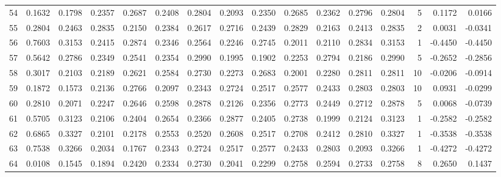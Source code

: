 \begin{tabular}{lrrrrrrrrrrrrrrr}
54  &      0.1632 &  0.1798 &  0.2357 &  0.2687 &  0.2408 &  0.2804 &  0.2093 &  0.2350 &  0.2685 &  0.2362 &   0.2796 &     0.2804 &      5 &                    0.1172 &                     0.0166 \\
55  &      0.2804 &  0.2463 &  0.2835 &  0.2150 &  0.2384 &  0.2617 &  0.2716 &  0.2439 &  0.2829 &  0.2163 &   0.2413 &     0.2835 &      2 &                    0.0031 &                    -0.0341 \\
56  &      0.7603 &  0.3153 &  0.2415 &  0.2874 &  0.2346 &  0.2564 &  0.2246 &  0.2745 &  0.2011 &  0.2110 &   0.2834 &     0.3153 &      1 &                   -0.4450 &                    -0.4450 \\
57  &      0.5642 &  0.2786 &  0.2349 &  0.2541 &  0.2354 &  0.2990 &  0.1995 &  0.1902 &  0.2253 &  0.2794 &   0.2186 &     0.2990 &      5 &                   -0.2652 &                    -0.2856 \\
58  &      0.3017 &  0.2103 &  0.2189 &  0.2621 &  0.2584 &  0.2730 &  0.2273 &  0.2683 &  0.2001 &  0.2280 &   0.2811 &     0.2811 &     10 &                   -0.0206 &                    -0.0914 \\
59  &      0.1872 &  0.1573 &  0.2136 &  0.2766 &  0.2097 &  0.2343 &  0.2724 &  0.2517 &  0.2577 &  0.2433 &   0.2803 &     0.2803 &     10 &                    0.0931 &                    -0.0299 \\
60  &      0.2810 &  0.2071 &  0.2247 &  0.2646 &  0.2598 &  0.2878 &  0.2126 &  0.2356 &  0.2773 &  0.2449 &   0.2712 &     0.2878 &      5 &                    0.0068 &                    -0.0739 \\
61  &      0.5705 &  0.3123 &  0.2106 &  0.2404 &  0.2654 &  0.2366 &  0.2877 &  0.2405 &  0.2738 &  0.1999 &   0.2124 &     0.3123 &      1 &                   -0.2582 &                    -0.2582 \\
62  &      0.6865 &  0.3327 &  0.2101 &  0.2178 &  0.2553 &  0.2520 &  0.2608 &  0.2517 &  0.2708 &  0.2412 &   0.2810 &     0.3327 &      1 &                   -0.3538 &                    -0.3538 \\
63  &      0.7538 &  0.3266 &  0.2034 &  0.1767 &  0.2343 &  0.2724 &  0.2517 &  0.2577 &  0.2433 &  0.2803 &   0.2093 &     0.3266 &      1 &                   -0.4272 &                    -0.4272 \\
64  &      0.0108 &  0.1545 &  0.1894 &  0.2420 &  0.2334 &  0.2730 &  0.2041 &  0.2299 &  0.2758 &  0.2594 &   0.2733 &     0.2758 &      8 &                    0.2650 &                     0.1437 \\

\end{tabular}
